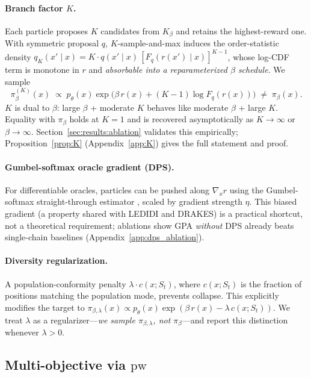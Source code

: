 \documentclass{article}
\theoremstyle{definition}
\theoremstyle{remark}
\newcommand{\gpa}{\textsc{GPA}\xspace}
\newcommand{\drakes}{\textsc{DRAKES}\xspace}
\newcommand{\ledidi}{\textsc{LEDIDI}\xspace}
\begin{document}
\paragraph{Branch factor $K$.}
Each particle proposes $K$ candidates from $K_\beta$ and retains the highest-reward one. With symmetric proposal $q$, $K$-sample-and-max induces the order-statistic density $q_K(x'\mid x)=K\!\cdot\!q(x'\mid x)\,[F_q(r(x')\mid x)]^{K-1}$, whose log-CDF term is monotone in $r$ and \emph{absorbable into a reparameterized $\beta$ schedule}. We sample
\begin{equation}
    \pi_\beta^{(K)}(x) \;\propto\; p_\theta(x)\exp\!\bigl(\beta\,r(x)+(K\!-\!1)\log F_q(r(x))\bigr) \;\neq\; \pi_\beta(x).
\end{equation}
$K$ is dual to $\beta$: large $\beta$ + moderate $K$ behaves like moderate $\beta$ + large $K$. Equality with $\pi_\beta$ holds at $K\!=\!1$ and is recovered asymptotically as $K\!\to\!\infty$ or $\beta\!\to\!\infty$. Section~\ref{sec:results:ablation} validates this empirically; Proposition~\ref{prop:K} (Appendix~\ref{app:K}) gives the full statement and proof.

\paragraph{Gumbel-softmax oracle gradient (DPS).}
For differentiable oracles, particles can be pushed along $\nabla_x r$ using the Gumbel-softmax straight-through estimator \citep{maddison2017concrete,jang2017categorical}, scaled by gradient strength $\eta$. This biased gradient (a property shared with \ledidi{} and \drakes{}) is a practical shortcut, not a theoretical requirement; ablations show \gpa{} \emph{without} DPS already beats single-chain baselines (Appendix~\ref{app:dps_ablation}).

\paragraph{Diversity regularization.}
A population-conformity penalty $\lambda\!\cdot\! c(x;S_t)$, where $c(x;S_t)$ is the fraction of positions matching the population mode, prevents collapse. This explicitly modifies the target to $\pi_{\beta,\lambda}(x)\propto p_\theta(x)\exp(\beta\,r(x)-\lambda\,c(x;S_t))$. We treat $\lambda$ as a regularizer—\emph{we sample $\pi_{\beta,\lambda}$, not $\pi_\beta$}—and report this distinction whenever $\lambda\!>\!0$.

\subsection{Multi-objective via $\mathrm{pw}$}\label{sec:method:pw}
\end{document}
